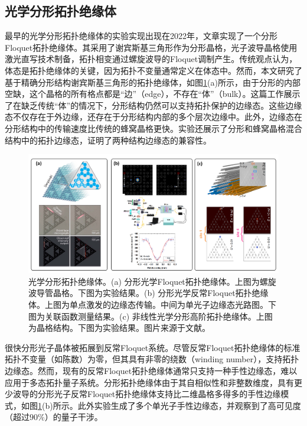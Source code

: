\subsection{光学分形拓扑绝缘体}
最早的光学分形拓扑绝缘体的实验实现出现在2022年\cite{biesenthal2022fractal}，文章实现了一个分形Floquet拓扑绝缘体。其采用了谢宾斯基三角形作为分形晶格，光子波导晶格使用激光直写技术制备，拓扑相变通过螺旋波导的Floquet调制产生。传统观点认为，体态是拓扑绝缘体的关键，因为拓扑不变量通常定义在体态中。然而，本文研究了基于精确分形结构谢宾斯基三角形的拓扑绝缘体，如图\ref{fig:PhotonFractal}(a)所示，由于分形的内部空缺，这个晶格的所有格点都是“边”（edge），不存在“体”（bulk）。这篇工作展示了在缺乏传统“体”的情况下，分形结构仍然可以支持拓扑保护的边缘态。这些边缘态不仅存在于外边缘，还存在于分形结构内部的多个层次边缘中。此外，边缘态在分形结构中的传输速度比传统的蜂窝晶格更快。实验还展示了分形和蜂窝晶格混合结构中的拓扑边缘态，证明了两种结构边缘态的兼容性。
\begin{figure}[htbp]
    \centering
    \includegraphics[width=1\linewidth]{figure/FractalTopo/PhotonFractal.jpg}
    \caption{光学分形拓扑绝缘体。(a) 分形光学Floquet拓扑绝缘体。上图为螺旋波导管晶格。下图为实验结果。(b) 分形光学反常Floquet拓扑绝缘体。上图为单点激发的边缘态传输。中间为单光子边缘态光路图。下图为关联函数测量结果。(c) 非线性光学分形高阶拓扑绝缘体。上图为晶格结构。下图为实验结果。图片来源于文献\cite{biesenthal2022fractal,li2023fractal,zhong2024observation}。}
    \label{fig:PhotonFractal}
\end{figure}
很快分形光子晶体被拓展到反常Floquet系统\cite{li2023fractal}。尽管反常Floquet拓扑绝缘体的标准拓扑不变量（如陈数）为零，但其具有非零的绕数（winding number），支持拓扑边缘态。然而，现有的反常Floquet拓扑绝缘体通常只支持一种手性边缘态，难以应用于多态拓扑量子系统。分形拓扑绝缘体由于其自相似性和非整数维度，具有更少波导的分形光子反常Floquet拓扑绝缘体支持比二维晶格多得多的手性边缘模式，如图\ref{fig:PhotonFractal}(b)所示。此外实验生成了多个单光子手性边缘态，并观察到了高可见度（超过$90\%$）的量子干涉。

